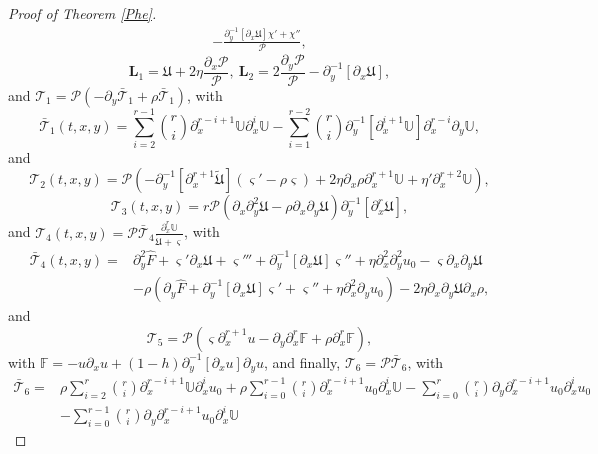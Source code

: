 \documentclass{amsart}
\numberwithin{equation}{section}
\begin{document}
\begin{proof}[Proof of Theorem \ref{Phe}]
\begin{align*}
  -\frac{\partial_{y}^{-1}\left[\partial_{x}\mathfrak{U}\right]\chi'+\chi''}{\mathcal{P}},
\end{align*}
$$\mathbf{L}_{1}=\mathfrak{U}+2\eta\frac{\partial_{x}\mathcal{P}}{\mathcal{P}},
~\mathbf{L}_{2}=2\frac{\partial_{y}\mathcal{P}}{\mathcal{P}}-\partial_{y}^{-1}\left[\partial_{x}\mathfrak{U}\right],$$
and $\mathcal{T}_{1}=\mathcal{P}(-\partial_{y}\bar{\mathcal{T}}_{1}+\rho\bar{\mathcal{T}}_{1})$, with
$$
\bar{\mathcal{T}}_{1}(t,x,y)=
 \sum_{i=2}^{r-1}\binom{r}{i}\partial_{x}^{r-i+1}\mathbb{U}\partial_{x}^{i}\mathbb{U}
-\sum_{i=1}^{r-2}\binom{r}{i}\partial_{y}^{-1}[\partial_{x}^{i+1}\mathbb{U}]\partial_{x}^{r-i}\partial_{y}\mathbb{U},
$$
and
$$
\mathcal{T}_{2}(t,x,y)
= \mathcal{P}\left(-\partial_{y}^{-1}[\partial_{x}^{r+1}\tilde{\mathfrak{U}}](\varsigma'-\rho\varsigma)
 +2\eta\partial_{x}\rho\partial_{x}^{r+1}\mathbb{U}+\eta'\partial_{x}^{r+2}\mathbb{U}\right),
$$
$$
\mathcal{T}_{3}(t,x,y)
=r\mathcal{P}\left(\partial_{x}\partial_{y}^{2}\mathfrak{U}-\rho\partial_{x}\partial_{y}\mathfrak{U}\right)\partial_{y}^{-1}[\partial_{x}^{r}\mathfrak{U}],
$$
and $\mathcal{T}_{4}(t,x,y)=\mathcal{P}\bar{\mathcal{T}}_{4}\frac{\partial_{x}^{r}\mathbb{U}}{\dot{\mathfrak{U}}+\varsigma}$, with
\begin{align*}
\bar{\mathcal{T}}_{4}(t,x,y)
=&\partial_{y}^{2}\hat{F}+\varsigma'\partial_{x}\mathfrak{U}+\varsigma'''+\partial_{y}^{-1}[\partial_{x}\mathfrak{U}]\varsigma''+\eta\partial_{x}^{2}\partial_{y}^{2}u_{0}-\varsigma\partial_{x}\partial_{y}\mathfrak{U}\\
 &-\rho\left(\partial_{y}\hat{F}+\partial_{y}^{-1}[\partial_{x}\mathfrak{U}]\varsigma'+\varsigma''+\eta\partial_{x}^{2}\partial_{y}u_{0}\right)
  -2\eta\partial_{x}\partial_{y}\mathfrak{U}\partial_{x}\rho,
\end{align*}
and
$$
\mathcal{T}_{5}=\mathcal{P}(\varsigma\partial_{x}^{r+1}u-\partial_{y}\partial_{x}^{r}\mathbb{F}+\rho\partial_{x}^{r}\mathbb{F}),
$$
with $\mathbb{F}=-u\partial_{x}u+(1-h)\partial_{y}^{-1}[\partial_{x}u]\partial_{y}u$, and finally, $\mathcal{T}_{6}=\mathcal{P}\bar{\mathcal{T}}_{6}$, with
\begin{align*}
\bar{\mathcal{T}}_{6}
=& \rho\sum_{i=2}^{r}\binom{r}{i}\partial_{x}^{r-i+1}\mathbb{U}\partial_{x}^{i}u_{0}
  +\rho\sum_{i=0}^{r-1}\binom{r}{i}\partial_{x}^{r-i+1}u_{0}\partial_{x}^{i}\mathbb{U}
  -\sum_{i=0}^{r}\binom{r}{i}\partial_{y}\partial_{x}^{r-i+1}u_{0}\partial_{x}^{i}u_{0}\\
 &-\sum_{i=0}^{r-1}\binom{r}{i}\partial_{y}\partial_{x}^{r-i+1}u_{0}\partial_{x}^{i}\mathbb{U}

\end{align*}
\end{proof}
\end{document}
